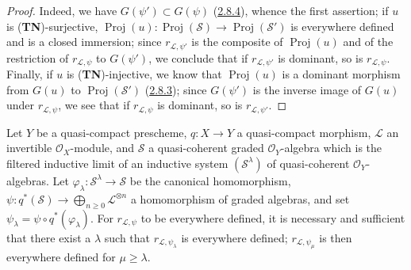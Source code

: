 \begin{proof}
Indeed, we have $G(\psi')\subset G(\psi)$
(\hyperref[II.2.8.4]{2.8.4}), whence the first assertion; if $u$ is
(\textbf{TN})-surjective,
$\operatorname{Proj}(u):\operatorname{Proj}(\mathcal{S})\to
\operatorname{Proj}(\mathcal{S}')$ is everywhere defined and is a closed
immersion; since $r_{\mathcal{L},\psi'}$ is the composite of
$\operatorname{Proj}(u)$ and of the restriction of $r_{\mathcal{L},\psi}$ to
$G(\psi')$, we conclude that if $r_{\mathcal{L},\psi'}$ is dominant, so is
$r_{\mathcal{L},\psi}$. Finally, if $u$ is
(\textbf{TN})-injective, we know that $\operatorname{Proj}(u)$ is a dominant
morphism from $G(u)$ to $\operatorname{Proj}(\mathcal{S}')$
(\hyperref[II.2.8.3]{2.8.3}); since $G(\psi')$ is the inverse image of
$G(u)$ under $r_{\mathcal{L},\psi}$, we see that if $r_{\mathcal{L},\psi}$ is
dominant, so is $r_{\mathcal{L},\psi'}$.
\end{proof}

\begin{proposition}[3.7.7]
\label{II.3.7.7}
Let $Y$ be a quasi-compact prescheme, $q:X\to Y$ a quasi-compact morphism,
$\mathcal{L}$ an invertible $\mathcal{O}_X$-module, and $\mathcal{S}$ a
quasi-coherent graded $\mathcal{O}_Y$-algebra which is the filtered inductive
limit of an inductive system $(\mathcal{S}^\lambda)$ of quasi-coherent
$\mathcal{O}_Y$-algebras. Let
$\varphi_\lambda:\mathcal{S}^\lambda\to\mathcal{S}$ be the canonical
homomorphism,
$\psi:q^*(\mathcal{S})\to\bigoplus_{n\geq0}\mathcal{L}^{\otimes n}$ a
homomorphism of graded algebras, and set
$\psi_\lambda=\psi\circ q^*(\varphi_\lambda)$. For
$r_{\mathcal{L},\psi}$ to be everywhere defined, it is necessary and sufficient
that there exist a $\lambda$ such that $r_{\mathcal{L},\psi_\lambda}$ is
everywhere defined; $r_{\mathcal{L},\psi_\mu}$ is then everywhere defined for
$\mu\geq\lambda$.
\end{proposition}

